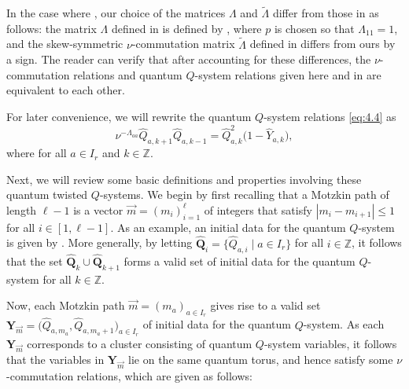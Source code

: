 \documentclass[pdftex]{sigma}
\numberwithin{equation}{section}
\begin{document}
\begin{remark*}
In the case where , our choice of the matrices $\Lambda$ and $\tilde{\Lambda}$ differ from those in \cite{DFK24} as follows: the matrix $\Lambda$ defined in \cite[Definition 4.1]{DFK24} is defined by , where $p$ is chosen so that $\Lambda_{11}=1$, and the skew-symmetric $\nu$-commutation matrix $\tilde{\Lambda}$ defined in \cite[Remark 4.2]{DFK24} differs from ours by a sign. The reader can verify that after accounting for these differences, the $\nu$-commutation relations and quantum $Q$-system relations given here and in \cite{DFK24} are equivalent to each other.
\end{remark*}

For later convenience, we will rewrite the quantum  $Q$-system relations \eqref{eq:4.4} as
\begin{equation}\label{eq:4.5}
\nu^{-\Lambda_{aa}}\widehat{Q}_{a,k+1}\widehat{Q}_{a,k-1}= \widehat{Q}_{a,k}^2\bigl(1-\widehat{Y}_{a,k}\bigr),
\end{equation}
where  for all $a\in I_r$ and $k\in\mathbb{Z}$.

Next, we will review some basic definitions and properties involving these quantum twisted $Q$-systems. We begin by first recalling that a Motzkin path of length $\ell-1$ is a vector ${\vec{m}=(m_i)_{i=1}^{\ell}}$ of integers that satisfy $|m_i-m_{i+1}|\leq 1$ for all $i\in[1,\ell-1]$. As an example, an initial data for the quantum  $Q$-system is given by . More generally, by letting $\widehat{\mathbf{Q}}_i=\bigl\{\widehat{Q}_{a,i}\mid a\in I_r\bigr\}$ for all $i\in\mathbb{Z}$, it follows that the set $\widehat{\mathbf{Q}}_k\cup\widehat{\mathbf{Q}}_{k+1}$ forms a valid set of initial data for the quantum  $Q$-system for all $k\in\mathbb{Z}$.

Now, each Motzkin path $\vec{m}=(m_a)_{a\in I_r}$ gives rise to a valid set $\mathbf{Y}_{\vec{m}}=\bigl(\widehat{Q}_{a,m_a}, \widehat{Q}_{a,m_a+1}\bigr)_{a\in I_r}$ of initial data for the quantum $Q$-system. As each $\mathbf{Y}_{\vec{m}}$ corresponds to a cluster consisting of quantum $Q$-system variables, it follows that the variables in $\mathbf{Y}_{\vec{m}}$ lie on the same quantum torus, and hence satisfy some $\nu$-commutation relations, which are given as follows:
\end{document}
